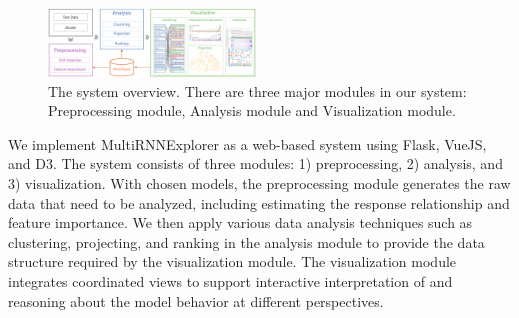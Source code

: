 \begin{figure}[t]
	\centering
    \includegraphics[width=0.49\textwidth]{pictures/System_framework.pdf}
	\vspace{-3mm}
	\caption{The system overview. There are three major modules in our system: Preprocessing module, Analysis module and Visualization module. 
	}
	\label{fig:system_framework}
	\vspace{-4mm}
\end{figure}


We implement MultiRNNExplorer as a web-based system using Flask, VueJS, and D3. 
The system consists of three modules: 1) preprocessing, 2) analysis, and 3) visualization.
With chosen models, the preprocessing module generates the raw data that need to be analyzed, including estimating the response relationship and feature importance.
We then apply various data analysis techniques such as clustering, projecting, and ranking in the analysis module to provide the data structure required by the visualization module.
The visualization module integrates coordinated views to support interactive interpretation of and reasoning about the model behavior at different perspectives. 



